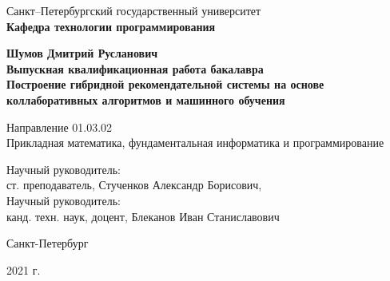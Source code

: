 \begin{titlepage}
\begin{center}

Санкт--Петербургский
государственный университет
\\\textbf{Кафедра технологии программирования}

\vspace{35mm}

\textbf{\large Шумов Дмитрий Русланович} \\[12mm]

\textbf{\large Выпускная квалификационная работа бакалавра}\\[12mm]
\textbf{\large Построение гибридной рекомендательной системы на основе коллаборативных алгоритмов и машинного обучения}

\vspace{20mm}
Направление 01.03.02
\\Прикладная математика, фундаментальная информатика и программирование\\[30mm]


\begin{flushright}
{Научный руководитель:} \\
ст. преподаватель, Стученков Александр Борисович,\\
{Научный руководитель:} \\
канд. техн. наук, доцент, Блеканов Иван Станиславович
\end{flushright}

\vfill 

{Санкт-Петербург}
\par{2021 г.}
\end{center}
\end{titlepage}
\restoregeometry
\addtocounter{page}{1}
